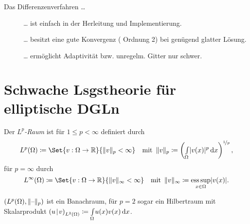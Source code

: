 \documentclass{cheat-sheet}
\newcommand{\Cont}{\mathcal{C}} %
\newcommand{\scp}[2]{\left( #1 \!\mid\! #2 \right)} %
\DeclareMathOperator*{\esssup}{ess\,sup} %
\begin{document}
\begin{bem}
  Das Differenzenverfahren \ldots
  \begin{description}
    \item[{\Smiley[1.2]}] \ldots{} ist einfach in der Herleitung und Implementierung. 
    \item[{\Neutrey[1.2]}] \ldots{} besitzt eine gute Konvergenz (\zB{} Ordnung 2) bei genügend glatter Lösung. 
    \item[{\Sadey[1.2]}] \ldots{} ermöglicht Adaptivität bzw. unregelm. Gitter nur schwer. 
  \end{description}
\end{bem}


\section{Schwache Lsgstheorie für elliptische DGLn}

\iffalse
\begin{bspe}
  \begin{itemize}
    \item $u''(x) = f$ in $\Omega = \ointerval{0}{1}$, $u(0) = g_0$, $u'(0) = g_1$
    \item $u_t(x, t) + c u_x(x, t) = 0$, $u(x, 0) = g(x)$, $g \in \Cont^1$. Lösung: $u(x, t) = g(x - c t)$
  \end{itemize}
\end{bspe}
\fi


\begin{defn}
  Der \emph{$L^p$-Raum} ist für $1 \leq p < \infty$ definiert durch
  \[
    L^p(\Omega) \coloneqq \Set{v : \Omega \to \R}{\norm{v}_p < \infty}
    \quad \text{mit} \enspace
    \norm{v}_p \coloneqq \left( \Int{\Omega}{}{\abs{v(x)}^p}{x} \right)^{\nicefrac{1}{p}},
  \]
  für $p = \infty$ durch
  \[
    L^\infty(\Omega) \coloneqq \Set{v : \Omega \to \R}{\norm{v}_\infty < \infty}
    \quad \text{mit} \enspace
    \norm{v}_\infty \coloneqq \esssup_{x \in \Omega} \abs{v(x)}.
  \]
\end{defn}

\begin{bem}
  $(L^p(\Omega), \lVert\text{--}\rVert_p)$ ist ein Banachraum, für $p = 2$ sogar ein Hilbertraum mit Skalarprodukt $\scp{u}{v}_{L^2(\Omega)} \coloneqq \Int{\Omega}{}{u(x) v(x)}{x}$.
\end{bem}
\end{document}
